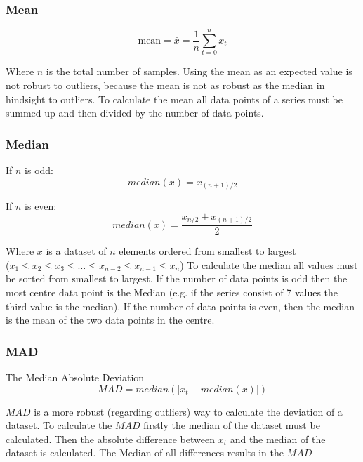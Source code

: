 \subsubsection{Mean}
\begin{equation}
  \text{mean} = \bar{x} = \frac{1}{n} \sum^n_{t=0}x_t
\end{equation}

Where $n$ is the total number of samples. Using the mean as an expected value is not robust to outliers, because the mean is not as robust as the median in hindsight to outliers. To calculate the mean all data points of a series must be summed up and then divided by the number of data points.
\subsubsection{Median}
If $n$ is odd:
\begin{equation}
  median(x) = x_{(n+1)/2}
\end{equation}

If $n$ is even:
\begin{equation}
  median(x) = \frac{x_{n/2} + x_{(n+1)/2}}{2}
\end{equation}

Where $x$ is a dataset of $n$ elements ordered from smallest to largest\\
($x_1 \leq x_2 \leq x_3 \leq \ldots \leq x_{n-2} \leq x_{n-1} \leq x_n$)
\cite{blazquez-garciaReviewOutlierAnomaly2020}
To calculate the median all values must be sorted from smallest to largest. If the number of data points is odd then the most centre data point is the Median (e.g. if the series consist of 7 values the third value is the median). If the number of data points is even, then the median is the mean of the two data points in the centre.
\subsubsection{\ac{MAD}}
The Median Absolute Deviation 
\begin{equation}
  MAD = median(|x_t - median(x)|)
\end{equation}

$MAD$ is a more robust (regarding outliers) way to calculate the deviation of a dataset. To calculate the $MAD$ firstly the median of the dataset must be calculated. Then the absolute difference between $x_t$ and the median of the dataset is calculated. The Median of all differences results in the $MAD$
\cite{leysDetectingOutliersNot2013, mehrangOutlierDetectionWeight2015}

